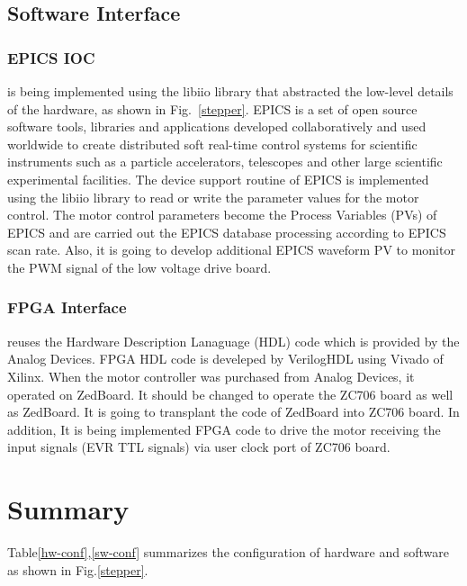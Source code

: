 \documentclass[a4paper,
              ]{jacow}
\begin{document}
\subsection{Software Interface}

\subsubsection{EPICS IOC} 
is being implemented using the libiio library that abstracted the low-level details of the hardware, as shown in Fig.~\ref{stepper}. EPICS is a set of open source software tools, libraries and applications developed collaboratively and used worldwide to create distributed soft real-time control systems for scientific instruments such as a particle accelerators, telescopes and other large scientific experimental facilities\cite{epics}.
The device support routine of EPICS is implemented using the libiio library to read or write the parameter values for the motor control. The motor control parameters become the Process Variables (PVs) of EPICS and are carried out the EPICS database processing according to EPICS scan rate. Also, it is going to develop additional EPICS waveform PV to monitor the PWM signal of the low voltage drive board.

\subsubsection{FPGA Interface}
reuses the Hardware Description Lanaguage (HDL) code which is provided by the Analog Devices. FPGA HDL code is develeped by VerilogHDL using Vivado of Xilinx. When the motor controller was purchased from Analog Devices, it operated on ZedBoard. It should be changed to operate the ZC706 board as well as ZedBoard. It is going to transplant the code of ZedBoard into ZC706 board. In addition, It is being implemented FPGA code to drive the motor receiving the input signals (EVR TTL signals) via user clock port of ZC706 board.


\section{Summary}

Table\ref{hw-conf},\ref{sw-conf} summarizes the configuration of hardware and software as shown in Fig.\ref{stepper}.
\end{document}
